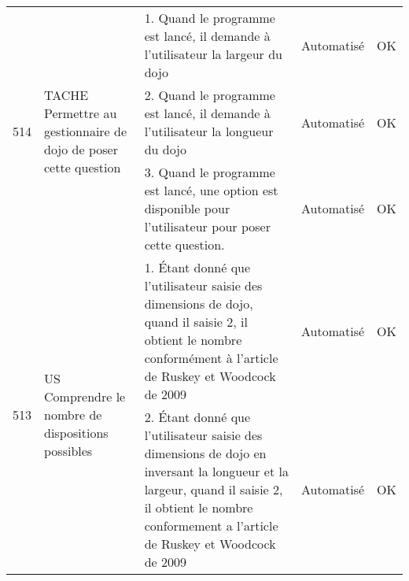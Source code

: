 \begin{adjustwidth}{-1.5cm}{0cm}
{\begin{tabular}{|m{0.6cm}|m{5.5cm}|m{8cm}|m{2cm}|c|}
            \multirow{3}{0.6cm}{514} & \multirow{3}{5.5cm}{TACHE Permettre au gestionnaire de dojo de poser cette question}                                                          & 1. Quand le programme est lancé, il demande à l'utilisateur la largeur du dojo                                                                                                                                             & Automatisé      & OK       \\ \cline{3-5}
                                     &                                                                                                                                               & 2. Quand le programme est lancé, il demande à l'utilisateur la longueur du dojo                                                                                                                                            & Automatisé      & OK       \\ \cline{3-5}
                                     &                                                                                                                                               & 3. Quand le programme est lancé, une option est disponible pour l'utilisateur pour poser cette question.                                                                                                                   & Automatisé      & OK       \\ \hline
            \multirow{2}{0.6cm}{513} & \multirow{2}{5.5cm}{US Comprendre le nombre de dispositions possibles}                                                                        & \cellcolor{tsyellow} 1. Étant donné que l'utilisateur saisie des dimensions de dojo, quand il saisie 2, il obtient le nombre conformément à l'article de Ruskey et Woodcock de 2009                                        & Automatisé      & OK       \\ \cline{3-5}
                                     &                                                                                                                                               & \cellcolor{tsyellow} 2. Étant donné que l'utilisateur saisie des dimensions de dojo en inversant la longueur et la largeur, quand il saisie 2, il obtient le nombre conformement a l'article de Ruskey et Woodcock de 2009 & Automatisé      & OK       \\ \hline


\end{tabular}}
\end{adjustwidth}
